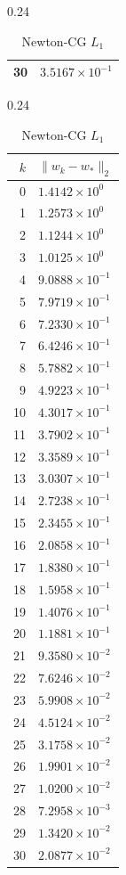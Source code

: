 \documentclass[italian, a4paper, twoside, binding=6mm]{sapthesis}
\begin{document}
\begin{table}[H]
\begin{subtable}{0.24\textwidth}
\begin{tabular}{@{}rl@{}}
30 & $3.5167\times10^{-1}$\\
\bottomrule
\end{tabular}
\end{subtable}\hfill
\begin{subtable}{0.24\textwidth}
\centering
\caption{Newton-CG $L_1$}
\begin{tabular}{@{}rl@{}}
\toprule
$k$ & $\|w_k-w_*\|_2$\\
\midrule
0 & $1.4142\times10^{0}$\\
1 & $1.2573\times10^{0}$\\
2 & $1.1244\times10^{0}$\\
3 & $1.0125\times10^{0}$\\
4 & $9.0888\times10^{-1}$\\
5 & $7.9719\times10^{-1}$\\
6 & $7.2330\times10^{-1}$\\
7 & $6.4246\times10^{-1}$\\
8 & $5.7882\times10^{-1}$\\
9 & $4.9223\times10^{-1}$\\
10 & $4.3017\times10^{-1}$\\
11 & $3.7902\times10^{-1}$\\
12 & $3.3589\times10^{-1}$\\
13 & $3.0307\times10^{-1}$\\
14 & $2.7238\times10^{-1}$\\
15 & $2.3455\times10^{-1}$\\
16 & $2.0858\times10^{-1}$\\
17 & $1.8380\times10^{-1}$\\
18 & $1.5958\times10^{-1}$\\
19 & $1.4076\times10^{-1}$\\
20 & $1.1881\times10^{-1}$\\
21 & $9.3580\times10^{-2}$\\
22 & $7.6246\times10^{-2}$\\
23 & $5.9908\times10^{-2}$\\
24 & $4.5124\times10^{-2}$\\
25 & $3.1758\times10^{-2}$\\
26 & $1.9901\times10^{-2}$\\
27 & $1.0200\times10^{-2}$\\
28 & $7.2958\times10^{-3}$\\
29 & $1.3420\times10^{-2}$\\
30 & $2.0877\times10^{-2}$\\
\bottomrule
\end{tabular}

\end{subtable}
\end{table}
\end{document}
